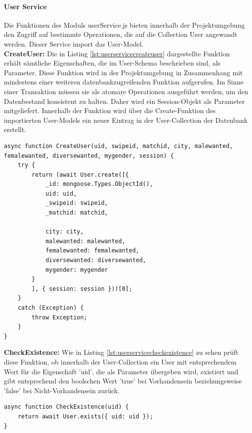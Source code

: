 %
%

\paragraph{User Service}
Die Funktionen des Moduls userService.js bieten innerhalb der Projektumgebung den Zugriff auf bestimmte Operationen, die auf die Collection User angewandt werden. Dieser Service import das User-Model.\\

\noindent
\textbf{CreateUser:}
Die in Listing \ref{lst:userservicecreateuser} dargestellte Funktion erhält sämtliche Eigenschaften, die im User-Schema beschrieben sind, als Parameter. Diese Funktion wird in der Projektumgebung in Zusammenhang mit mindestens einer weiteren datenbankzugreifenden Funktion aufgerufen. Im Sinne einer Transaktion müssen sie als atomare Operationen ausgeführt werden, um den Datenbestand konsistent zu halten. Daher wird ein Session-Objekt als Parameter mitgeliefert. Innerhalb der Funktion wird über die Create-Funktion des importierten User-Models ein neuer Eintrag in der User-Collection der Datenbank erstellt.\\

\begin{lstlisting}[caption=User Service - CreateUser, label=lst:userservicecreateuser]
async function CreateUser(uid, swipeid, matchid, city, malewanted, femalewanted, diversewanted, mygender, session) {
    try {
        return (await User.create([{
            _id: mongoose.Types.ObjectId(),
            uid: uid,
            _swipeid: swipeid,
            _matchid: matchid,

            city: city,
            malewanted: malewanted,
            femalewanted: femalewanted,
            diversewanted: diversewanted,
            mygender: mygender
        }
        ], { session: session }))[0];
    }
    catch (Exception) {
        throw Exception;
    }
}
\end{lstlisting}

\noindent
\textbf{CheckExistence:}
Wie in Listing \ref{lst:userservicecheckexistence} zu sehen prüft diese Funktion, ob innerhalb der User-Collection ein User mit entsprechendem Wert für die Eigenschaft 'uid', die als Parameter übergeben wird, existiert und gibt entsprechend den boolschen Wert 'true' bei Vorhandensein beziehungsweise 'false' bei Nicht-Vorhandensein zurück.\\

\begin{lstlisting}[caption=User Service - CheckExistence, label=lst:userservicecheckexistence]
async function CheckExistence(uid) {
    return await User.exists({ uid: uid });
}
\end{lstlisting}

